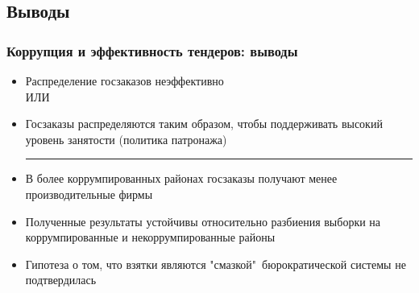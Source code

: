 \subsection{Выводы}
\begin{frame}
\frametitle{Коррупция и эффективность тендеров: выводы}
	\begin{itemize}
		\item Распределение госзаказов неэффективно
		\\ИЛИ
		\item Госзаказы распределяются таким образом, чтобы поддерживать высокий уровень занятости (политика патронажа)
		\medskip\hrule\medskip
		\item В более коррумпированных районах госзаказы получают менее производительные фирмы
		\item Полученные результаты устойчивы относительно разбиения выборки на коррумпированные и некоррумпированные районы
		\item Гипотеза о том, что взятки являются "смазкой"\ бюрократической системы не подтвердилась
	\end{itemize}
\end{frame}

